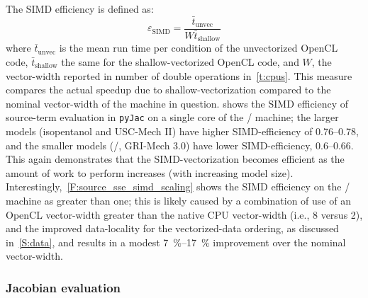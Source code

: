 \documentclass[12pt,number,sort&compress,preprint]{elsarticle}
\begin{document}
The SIMD efficiency is defined as:
\begin{equation}
 \label{e:simd_efficiency}
 \varepsilon_{\text{SIMD}} = \frac{\bar{t}_{\text{unvec}}}{W \bar{t}_{\text{shallow}}}
\end{equation}
where $\bar{t}_{\text{unvec}}$ is the mean run time per condition of the unvectorized OpenCL code, $\bar{t}_{\text{shallow}}$ the same for the shallow-vectorized OpenCL code, and $W$, the vector-width reported in number of double operations in~\cref{t:cpus}.
This measure compares the actual speedup due to shallow-vectorization compared to the nominal vector-width of the machine in question.
 shows the SIMD efficiency of source-term evaluation in \texttt{pyJac} on a single core of the \avx/ machine; the larger models (isopentanol and USC-Mech II) have higher SIMD-efficiency of \numrange{0.76}{0.78}, and the smaller models (\slash{}, GRI-Mech \num{3.0}) have lower SIMD-efficiency, \numrange{0.6}{0.66}.
This again demonstrates that the SIMD-vectorization becomes efficient as the amount of work to perform increases (with increasing model size).
Interestingly,~\cref{F:source_sse_simd_scaling} shows the SIMD efficiency on the \sse/ machine as greater than one; this is likely caused by a combination of use of an OpenCL vector-width greater than the native CPU vector-width (i.e., \num{8} versus \num{2}), and the improved data-locality for the vectorized-data ordering, as discussed in~\cref{S:data}, and results in a modest \SIrange{7}{17}{\percent} improvement over the nominal vector-width.


\subsubsection{Jacobian evaluation}
\label{S:jacobian_results}
\end{document}
